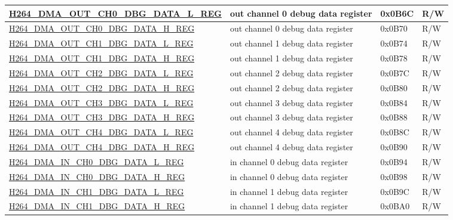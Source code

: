 \begin{longtable}{ | p{7.5cm} | p{5.7cm} | p{1.2cm} | p{1cm} | }
    \hyperref[regdesc:H264DMAOUTCH0DBGDATALREG]{H264\_DMA\_OUT\_CH0\_DBG\_DATA\_L\_REG} & out channel 0 debug data register & 0x0B6C & R/W \\ \hline
    \hyperref[regdesc:H264DMAOUTCH0DBGDATAHREG]{H264\_DMA\_OUT\_CH0\_DBG\_DATA\_H\_REG} & out channel 0 debug data register & 0x0B70 & R/W \\ \hline
    \hyperref[regdesc:H264DMAOUTCH1DBGDATALREG]{H264\_DMA\_OUT\_CH1\_DBG\_DATA\_L\_REG} & out channel 1 debug data register & 0x0B74 & R/W \\ \hline
    \hyperref[regdesc:H264DMAOUTCH1DBGDATAHREG]{H264\_DMA\_OUT\_CH1\_DBG\_DATA\_H\_REG} & out channel 1 debug data register & 0x0B78 & R/W \\ \hline
    \hyperref[regdesc:H264DMAOUTCH2DBGDATALREG]{H264\_DMA\_OUT\_CH2\_DBG\_DATA\_L\_REG} & out channel 2 debug data register & 0x0B7C & R/W \\ \hline
    \hyperref[regdesc:H264DMAOUTCH2DBGDATAHREG]{H264\_DMA\_OUT\_CH2\_DBG\_DATA\_H\_REG} & out channel 2 debug data register & 0x0B80 & R/W \\ \hline
    \hyperref[regdesc:H264DMAOUTCH3DBGDATALREG]{H264\_DMA\_OUT\_CH3\_DBG\_DATA\_L\_REG} & out channel 3 debug data register & 0x0B84 & R/W \\ \hline
    \hyperref[regdesc:H264DMAOUTCH3DBGDATAHREG]{H264\_DMA\_OUT\_CH3\_DBG\_DATA\_H\_REG} & out channel 3 debug data register & 0x0B88 & R/W \\ \hline
    \hyperref[regdesc:H264DMAOUTCH4DBGDATALREG]{H264\_DMA\_OUT\_CH4\_DBG\_DATA\_L\_REG} & out channel 4 debug data register & 0x0B8C & R/W \\ \hline
    \hyperref[regdesc:H264DMAOUTCH4DBGDATAHREG]{H264\_DMA\_OUT\_CH4\_DBG\_DATA\_H\_REG} & out channel 4 debug data register & 0x0B90 & R/W \\ \hline
    \hyperref[regdesc:H264DMAINCH0DBGDATALREG]{H264\_DMA\_IN\_CH0\_DBG\_DATA\_L\_REG} & in channel 0 debug data register & 0x0B94 & R/W \\ \hline
    \hyperref[regdesc:H264DMAINCH0DBGDATAHREG]{H264\_DMA\_IN\_CH0\_DBG\_DATA\_H\_REG} & in channel 0 debug data register & 0x0B98 & R/W \\ \hline
    \hyperref[regdesc:H264DMAINCH1DBGDATALREG]{H264\_DMA\_IN\_CH1\_DBG\_DATA\_L\_REG} & in channel 1 debug data register & 0x0B9C & R/W \\ \hline
    \hyperref[regdesc:H264DMAINCH1DBGDATAHREG]{H264\_DMA\_IN\_CH1\_DBG\_DATA\_H\_REG} & in channel 1 debug data register & 0x0BA0 & R/W \\ \hline

\end{longtable}
